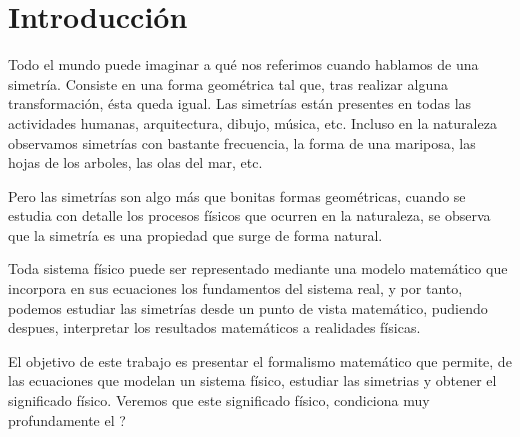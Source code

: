 \section{Introducción}\label{sec:introduccion}

Todo el mundo puede imaginar a qué nos referimos cuando hablamos de una simetría.
Consiste en una forma geométrica tal que, tras realizar alguna transformación, ésta queda igual.
Las simetrías están presentes en todas las actividades humanas, arquitectura, dibujo, música, etc.
Incluso en la naturaleza observamos simetrías con bastante frecuencia, la forma de una mariposa, las hojas de los arboles, las olas del mar, etc.

Pero las simetrías son algo más que bonitas formas geométricas, cuando se estudia con detalle los procesos físicos que ocurren en la naturaleza, se observa que la simetría es una propiedad que surge de forma natural.

Toda sistema físico puede ser representado mediante una modelo matemático que incorpora en sus ecuaciones los fundamentos del sistema real, y por tanto, podemos estudiar las simetrías desde un punto de vista matemático, pudiendo despues, interpretar los resultados matemáticos a realidades físicas.

El objetivo de este trabajo es presentar el formalismo matemático que permite, de las ecuaciones que modelan un sistema físico, estudiar las simetrias y obtener el significado físico.
Veremos que este significado físico, condiciona  muy profundamente el ?



